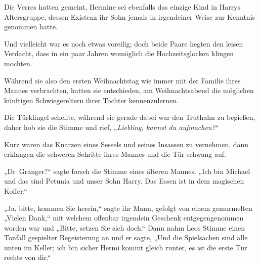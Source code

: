 Die Verres hatten gemeint, Hermine sei ebenfalls das einzige Kind in Harrys Altersgruppe, dessen Existenz ihr Sohn jemals in irgendeiner Weise zur Kenntnis genommen hatte.

Und vielleicht war es noch etwas voreilig; doch beide Paare hegten den leisen Verdacht, dass in ein paar Jahren womöglich die Hochzeitsglocken klingen mochten.

Während sie also den ersten Weihnachtstag wie immer mit der Familie ihres Mannes verbrachten, hatten sie entschieden, am Weihnachtsabend die möglichen künftigen Schwiegereltern ihrer Tochter kennenzulernen.

Die Türklingel schellte, während sie gerade dabei war den Truthahn zu begießen, daher hob sie die Stimme und rief, „\emph{Liebling, kannst du aufmachen?}“

Kurz waren das Knarzen eines Sessels und seines Insassen zu vernehmen, dann erklangen die schweren Schritte ihres Mannes und die Tür schwang auf.

„Dr~Granger?“ sagte forsch die Stimme eines älteren Mannes. „Ich bin Michael und das sind Petunia und unser Sohn Harry. Das Essen ist in dem magischen Koffer.“

„Ja, bitte, kommen Sie herein,“ sagte ihr Mann, gefolgt von einem gemurmelten „Vielen Dank,“ mit welchem offenbar irgendein Geschenk entgegengenommen worden war und „Bitte, setzen Sie sich doch.“ Dann nahm Leos Stimme einen Tonfall gespielter Begeisterung an und er sagte, „Und die Spielsachen sind alle unten im Keller; ich bin sicher Hermi kommt gleich runter, es ist die erste Tür rechts von dir.“

